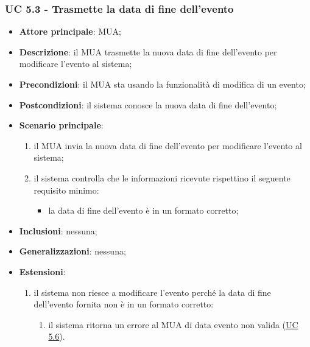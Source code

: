     \subsubsection{UC 5.3 - Trasmette la data di fine dell'evento} \label{sec:UC5.3}
    \begin{itemize}
        \item \textbf{Attore principale}: MUA;
        \item \textbf{Descrizione}: il MUA trasmette la nuova data di fine dell'evento per modificare l'evento al sistema;
        \item \textbf{Precondizioni}: il MUA sta usando la funzionalità di modifica di un evento;
        \item \textbf{Postcondizioni}: il sistema conosce la nuova data di fine dell'evento;
        \item \textbf{Scenario principale}:
            \begin{enumerate}
                \item il MUA invia la nuova data di fine dell'evento per modificare l'evento al sistema;
                \item il sistema controlla che le informazioni ricevute rispettino il seguente requisito minimo:
                    \begin{itemize}
                        \item la data di fine dell'evento è in un formato corretto;
                    \end{itemize}
            \end{enumerate}
        \item \textbf{Inclusioni}: nessuna;
        \item \textbf{Generalizzazioni}: nessuna;
        \item \textbf{Estensioni}:
            \begin{enumerate}[label=\alph*.]
                \item il sistema non riesce a modificare l'evento perché la data di fine dell'evento fornita non è in un formato corretto:
                \begin{enumerate}[label=\arabic*.]
                    \item il sistema ritorna un errore al MUA di data evento non valida (\hyperref[sec:UC5.6]{UC 5.6}).
                \end{enumerate}
            \end{enumerate}
    \end{itemize}

